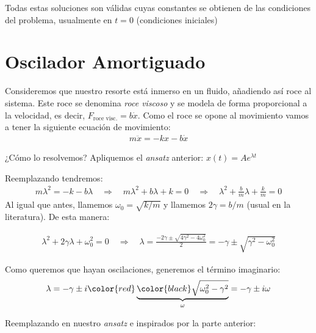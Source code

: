 \documentclass[letterpaper,11pt]{article}
\begin{document}
\noindent Todas estas soluciones son válidas cuyas constantes se obtienen de las condiciones del problema, usualmente en $t=0$ (condiciones iniciales)

\section*{Oscilador Amortiguado}

Consideremos que nuestro resorte está inmerso en un fluido, añadiendo así roce al sistema. Este roce se denomina \textit{roce viscoso} y se modela de forma proporcional a la velocidad, es decir, $F_{\text{roce visc.}} = b\dot{x}$. Como el roce se opone al movimiento vamos a tener la siguiente ecuación de movimiento:
\begin{align*}
    m\ddot{x}=-kx-b\dot{x}
\end{align*}

\noindent ¿Cómo lo resolvemos? Apliquemos el \textit{ansatz} anterior: $x(t)=Ae^{\lambda t}$

\noindent Reemplazando tendremos:
\begin{align*}
    m\lambda^2=-k-b\lambda \quad\Rightarrow\quad m\lambda^2+b\lambda+k=0 \quad \Rightarrow \quad \lambda^2+\frac{b}{m}\lambda+\frac{k}{m}=0
\end{align*}
\noindent Al igual que antes, llamemos $\omega_0=\sqrt{k/m}$ y llamemos $2\gamma=b/m$ (usual en la literatura). De esta manera:

\begin{align*}
    \lambda^2+2\gamma\lambda+\omega_0^2=0 \quad \Rightarrow\quad \lambda=\frac{-2\gamma\pm\sqrt{4\gamma^2-4\omega_0^2}}{2} = -\gamma\pm\sqrt{\gamma^2-\omega_0^2}
\end{align*}

\noindent Como queremos que hayan oscilaciones, generemos el término imaginario:
\begin{align*}
    \lambda = -\gamma \pm i {\color{red}\underbrace{\color{black}\sqrt{\omega_0^2-\gamma^2}}_\mathrm{\omega}}=-\gamma\pm i\omega
\end{align*}

\noindent Reemplazando en nuestro \textit{ansatz} e inspirados por la parte anterior:
\end{document}
